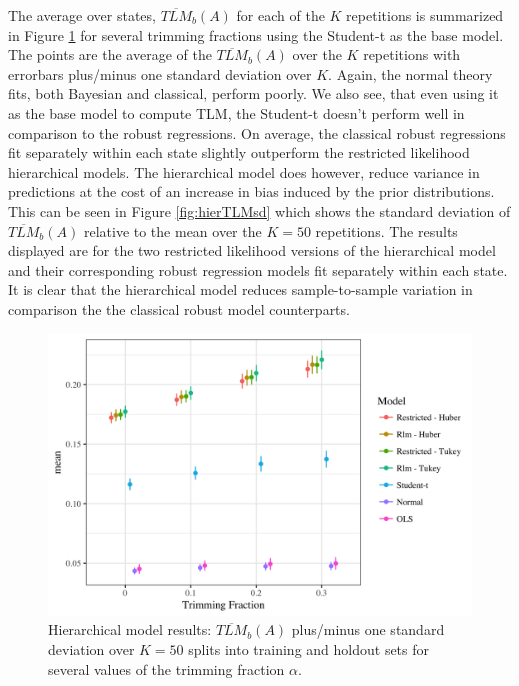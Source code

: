 \documentclass[ba]{imsart}
\begin{document}
The average over states, $\overline{TLM}_b(A)$ for each of the $K$ repetitions is summarized in Figure
\ref{fig:hierTLM} for several trimming fractions using the Student-t as the base model. The points are the average of the $\overline{TLM}_b(A)$ over the $K$ repetitions with errorbars plus/minus one standard deviation over $K$. Again, the normal theory fits, both Bayesian and classical, perform poorly.  We also see, that even using it as the base model to compute TLM, the Student-t doesn't perform well in comparison to the robust regressions. On average, the classical robust regressions fit separately within each state slightly outperform the restricted likelihood hierarchical models. The hierarchical model does however, reduce variance in predictions at the cost of an increase in bias induced by the prior distributions. This can be seen in Figure \ref{fig:hierTLMsd} which shows the standard deviation of $\overline{TLM}_b(A)$ relative to the mean over the $K=50$ repetitions. The results displayed are for the two restricted likelihood versions of the hierarchical model and their corresponding robust regression models fit separately within each state. It is clear that the hierarchical model reduces sample-to-sample variation in comparison the the classical robust model counterparts.  

\begin{figure}[t]
\centering
\includegraphics[width=6in]{hier_average_tlm.png}
\caption{Hierarchical model results: $\overline{TLM}_b(A)$  plus/minus one standard deviation over $K = 50$ splits into training and holdout sets for several values of the trimming fraction $\alpha$.}
\label{fig:hierTLM}
\end{figure}
\end{document}
